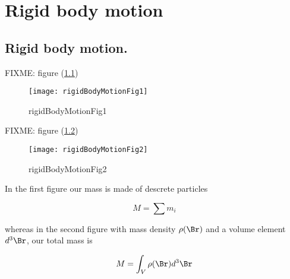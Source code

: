 
%


\chapter{Rigid body motion}
\label{chap:rigidBodyMotion}
{}
\date{Mar 7, 2012}

\beginArtWithToc

\section{Rigid body motion.}

FIXME: figure (\ref{fig:rigidBodyMotion:rigidBodyMotionFig1})
\begin{figure}[htp]
   \centering
   \texttt{[image: rigidBodyMotionFig1]}
   \caption{rigidBodyMotionFig1}\label{fig:rigidBodyMotion:rigidBodyMotionFig1}
\end{figure}

FIXME: figure (\ref{fig:rigidBodyMotion:rigidBodyMotionFig2})
\begin{figure}[htp]
   \centering
   \texttt{[image: rigidBodyMotionFig2]}
   \caption{rigidBodyMotionFig2}\label{fig:rigidBodyMotion:rigidBodyMotionFig2}
\end{figure}

In the first figure our mass is made of descrete particles

\begin{equation}\label{eqn:rigidBodyMotion:20}
M = \sum m_i
\end{equation}

whereas in the second figure with mass density $\rho(\Br)$ and a volume element $d^3\Br$, our total mass is

\begin{equation}\label{eqn:rigidBodyMotion:40}
M = \int_V \rho(\Br) d^3\Br
\end{equation}

